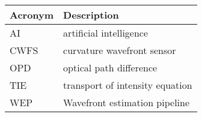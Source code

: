 \addtocounter{table}{-1}
\begin{longtable}{p{}p{}}\hline
\textbf{Acronym} & \textbf{Description}  \\\hline

AI & artificial intelligence \\\hline
CWFS & curvature wavefront sensor \\\hline
OPD & optical path difference \\\hline
TIE & transport of intensity equation \\\hline
WEP & Wavefront estimation pipeline \\\hline
\end{longtable}

